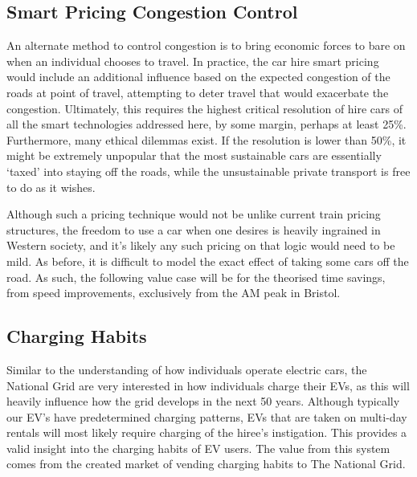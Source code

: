 \documentclass[conference]{IEEEtran}
\begin{document}
\subsection{Smart Pricing Congestion Control}

An alternate method to control congestion is to bring economic forces
to bare on when an individual chooses to travel. In practice, the car
hire smart pricing would include an additional influence based on the
expected congestion of the roads at point of travel, attempting to
deter travel that would exacerbate the congestion.  Ultimately, this
requires the highest critical resolution of hire cars of all the smart
technologies addressed here, by some margin, perhaps at least
25\%. Furthermore, many ethical dilemmas exist. If the resolution is
lower than 50\%, it might be extremely unpopular that the most
sustainable cars are essentially `taxed' into staying off the roads,
while the unsustainable private transport is free to do as it wishes.

Although such a pricing technique would not be unlike current train
pricing structures, the freedom to use a car when one desires is
heavily ingrained in Western society, and it’s likely any such pricing
on that logic would need to be mild. As before, it is difficult to
model the exact effect of taking some cars off the road. As such, the
following value case will be for the theorised time savings, from
speed improvements, exclusively from the AM peak in Bristol.


\subsection{Charging Habits}

Similar to the understanding of how individuals operate electric cars,
the National Grid are very interested in how individuals charge their
EVs, as this will heavily influence how the grid develops in the next
50 years.  Although typically our EV's have predetermined charging
patterns, EVs that are taken on multi-day rentals will most likely
require charging of the hiree’s instigation. This provides a valid
insight into the charging habits of EV users. The value from this
system comes from the created market of vending charging habits to The
National Grid.
\end{document}

